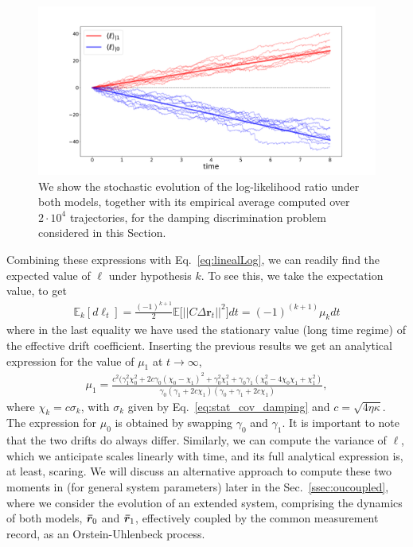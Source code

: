 \begin{figure}[t!]
    \centering
    \includegraphics[width=1.\textwidth]{Figures/CMON/damp-discri/temp/avg_ell_time.pdf}
    \caption{We show the stochastic evolution of the log-likelihood ratio under both models, together with its empirical average computed over $2 \cdot 10^{4}$ trajectories, for the damping discrimination problem considered in this Section.}
    \label{fig:liks_drfit}
\end{figure}

Combining these expressions with Eq.~\ref{eq:linealLog}, we can readily find the expected value of $\ell$ under hypothesis $k$. To see this, we take the expectation value, to get
\begin{align}\label{eq:dlav}
\mathbb{E}_k[d\ell_{t}] = \frac{(-1)^{k+1}}{2}\mathbb{E}\Big[||C \Delta\mathbf{r}_t  ||^2 \Big] dt = (-1)^{(k+1)} \mu_k dt
\end{align}
where in the last equality we have used the stationary value (long time regime) of the effective drift coefficient. Inserting the previous results we get an analytical expression for the value of $\mu_1$
at $t\to\infty$,
\begin{align}\label{eq:mukANAL}
\mu_1 = \frac{c^2(\gamma^2_1\chi^2_0 + 2c\gamma_0(\chi_0 - \chi_1)^2 + \gamma_0^2\chi_1^2 + \gamma_0\gamma_1(\chi_0^2 - 4\chi_0\chi_1 + \chi_1^2)}{\gamma_0(\gamma_1 + 2 c \chi_1)(\gamma_0 + \gamma_1 + 2 c \chi_1)},
\end{align}
where $\chi_k = c \sigma_k$, with $\sigma_k$ given by Eq.~\ref{eq:stat_cov_damping} and $c = \sqrt{4\eta\kappa}$. The expression for $\mu_0$ is obtained by swapping $\gamma_0$ and $\gamma_1$. It is important to note that the two drifts do always differ. Similarly, we can compute the variance of $\ell$, which we anticipate scales linearly with time, and its full analytical expression is, at least, scaring. We will discuss an alternative approach to compute these two moments in (for general system parameters) later in the Sec.~\ref{ssec:oucoupled}, where we consider the  evolution of an extended system, comprising the dynamics of both models, $\bm{\bar{r}}_{0}$
and $\bm{\bar{r}}_{1}$, effectively coupled by the common measurement record, as an Orstein-Uhlenbeck process.

